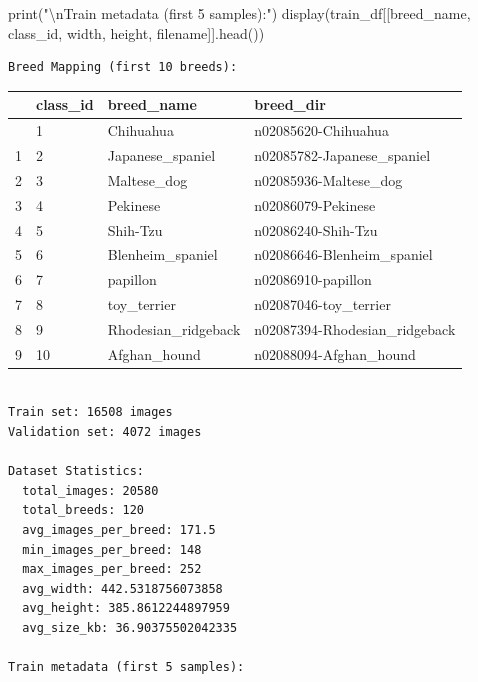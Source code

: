 \documentclass[
  letterpaper,
  DIV=11,
  numbers=noendperiod]{scrartcl}
\newenvironment{Shaded}{\begin{snugshade}}{\end{snugshade}}
\newcommand{\BuiltInTok}[1]{\textcolor[rgb]{0.00,0.23,0.31}{#1}}
\newcommand{\CharTok}[1]{\textcolor[rgb]{0.13,0.47,0.30}{#1}}
\newcommand{\NormalTok}[1]{\textcolor[rgb]{0.00,0.23,0.31}{#1}}
\newcommand{\StringTok}[1]{\textcolor[rgb]{0.13,0.47,0.30}{#1}}
\renewenvironment{Shaded}{%
  \begin{tcolorbox}[%
    enhanced,%
    colback=codebg,%
    colframe=codebg,%
    borderline west={3pt}{0pt}{sectionblue},%
    boxrule=0pt,%
    arc=0pt,%
    boxsep=5pt,%
    left=2mm,%
    right=2mm,%
    top=2mm,%
    bottom=2mm%
  ]%
}{%
  \end{tcolorbox}%
}
\begin{document}
\begin{Shaded}
\begin{Highlighting}[]
\BuiltInTok{print}\NormalTok{(}\StringTok{"}\CharTok{\textbackslash{}n}\StringTok{Train metadata (first 5 samples):"}\NormalTok{)}
\NormalTok{display(train\_df[[}\StringTok{\textquotesingle{}breed\_name\textquotesingle{}}\NormalTok{, }\StringTok{\textquotesingle{}class\_id\textquotesingle{}}\NormalTok{, }\StringTok{\textquotesingle{}width\textquotesingle{}}\NormalTok{, }\StringTok{\textquotesingle{}height\textquotesingle{}}\NormalTok{, }\StringTok{\textquotesingle{}filename\textquotesingle{}}\NormalTok{]].head())}
\end{Highlighting}
\end{Shaded}

\begin{verbatim}
Breed Mapping (first 10 breeds):
\end{verbatim}

\begin{longtable}[]{@{}llll@{}}
\toprule\noalign{}
& class\_id & breed\_name & breed\_dir \\
\midrule\noalign{}
\endhead
\bottomrule\noalign{}
\endlastfoot
0 & 1 & Chihuahua & n02085620-Chihuahua \\
1 & 2 & Japanese\_spaniel & n02085782-Japanese\_spaniel \\
2 & 3 & Maltese\_dog & n02085936-Maltese\_dog \\
3 & 4 & Pekinese & n02086079-Pekinese \\
4 & 5 & Shih-Tzu & n02086240-Shih-Tzu \\
5 & 6 & Blenheim\_spaniel & n02086646-Blenheim\_spaniel \\
6 & 7 & papillon & n02086910-papillon \\
7 & 8 & toy\_terrier & n02087046-toy\_terrier \\
8 & 9 & Rhodesian\_ridgeback & n02087394-Rhodesian\_ridgeback \\
9 & 10 & Afghan\_hound & n02088094-Afghan\_hound \\
\end{longtable}

\begin{verbatim}

Train set: 16508 images
Validation set: 4072 images

Dataset Statistics:
  total_images: 20580
  total_breeds: 120
  avg_images_per_breed: 171.5
  min_images_per_breed: 148
  max_images_per_breed: 252
  avg_width: 442.5318756073858
  avg_height: 385.8612244897959
  avg_size_kb: 36.90375502042335

Train metadata (first 5 samples):
\end{verbatim}
\end{document}
